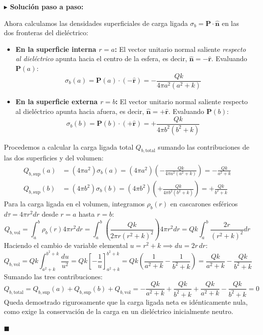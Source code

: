 \documentclass[11pt,a4paper]{book}
\newenvironment{solucion}{%
    \par\medskip\noindent\textbf{\color{blue!65!black}\Large $\blacktriangleright$ Solución paso a paso:}\par\medskip
}{%
    \hfill$\blacksquare$\par\bigskip
}
\newcommand{\rhat}{\hat{\bm{r}}}
\newcommand{\nhat}{\hat{\bm{n}}}
\newcommand{\Pvec}{\bm{P}}
\begin{document}
\begin{solucion}
Ahora calculamos las densidades superficiales de carga ligada $\sigma_b = \Pvec \cdot \nhat$ en las dos fronteras del dieléctrico:
\begin{itemize}
    \item \textbf{En la superficie interna $r = a$:} El vector unitario normal saliente \textit{respecto al dieléctrico} apunta hacia el centro de la esfera, es decir, $\nhat = -\rhat$. Evaluando $\Pvec(a)$:
    \begin{equation}
        \sigma_b(a) = \Pvec(a) \cdot (-\rhat) = -\frac{Q k}{4\pi a^2 (a^2 + k)}
    \end{equation}
    \item \textbf{En la superficie externa $r = b$:} El vector unitario normal saliente respecto al dieléctrico apunta hacia afuera, es decir, $\nhat = +\rhat$. Evaluando $\Pvec(b)$:
    \begin{equation}
        \sigma_b(b) = \Pvec(b) \cdot (+\rhat) = +\frac{Q k}{4\pi b^2 (b^2 + k)}
    \end{equation}
\end{itemize}

Procedemos a calcular la carga ligada total $Q_{b,\text{total}}$ sumando las contribuciones de las dos superficies y del volumen:
\begin{align}
    Q_{b,\text{sup}}(a) &= (4\pi a^2) \sigma_b(a) = (4\pi a^2)\left(-\frac{Q k}{4\pi a^2 (a^2 + k)}\right) = -\frac{Q k}{a^2 + k} \\
    Q_{b,\text{sup}}(b) &= (4\pi b^2) \sigma_b(b) = (4\pi b^2)\left(+\frac{Q k}{4\pi b^2 (b^2 + k)}\right) = +\frac{Q k}{b^2 + k}
\end{align}
Para la carga ligada en el volumen, integramos $\rho_b(r)$ en cascarones esféricos $d\tau = 4\pi r^2 dr$ desde $r=a$ hasta $r=b$:
\begin{equation}
    Q_{b,\text{vol}} = \int_{a}^{b} \rho_b(r) 4\pi r^2 dr = \int_{a}^{b} \left(\frac{Q k}{2\pi r (r^2 + k)^2}\right) 4\pi r^2 dr = Q k \int_{a}^{b} \frac{2r}{(r^2 + k)^2} dr
\end{equation}
Haciendo el cambio de variable elemental $u = r^2 + k \implies du = 2r\,dr$:
\begin{equation}
    Q_{b,\text{vol}} = Q k \int_{a^2+k}^{b^2+k} \frac{du}{u^2} = Q k \left[ -\frac{1}{u} \right]_{a^2+k}^{b^2+k} = Q k \left( \frac{1}{a^2 + k} - \frac{1}{b^2 + k} \right) = \frac{Q k}{a^2 + k} - \frac{Q k}{b^2 + k}
\end{equation}
Sumando las tres contribuciones:
\begin{equation}
    Q_{b,\text{total}} = Q_{b,\text{sup}}(a) + Q_{b,\text{sup}}(b) + Q_{b,\text{vol}} = -\frac{Q k}{a^2 + k} + \frac{Q k}{b^2 + k} + \frac{Q k}{a^2 + k} - \frac{Q k}{b^2 + k} = 0
\end{equation}
Queda demostrado rigurosamente que la carga ligada neta es idénticamente nula, como exige la conservación de la carga en un dieléctrico inicialmente neutro.


\end{solucion}
\end{document}
